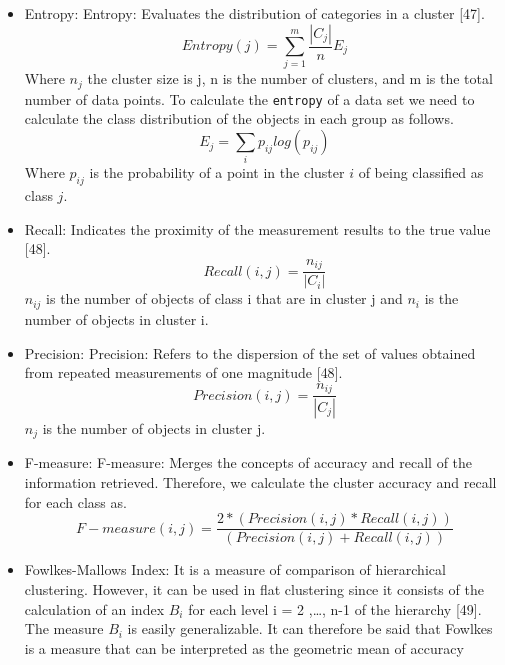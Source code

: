 \documentclass[
]{article}
\begin{document}
\begin{itemize}
\item
  Entropy: Entropy: Evaluates the distribution of categories in a
  cluster {[}47{]}. \begin{equation}
        Entropy(j) =  \sum_{j=1}^{m} \frac{|C_{j}|}{n}E_{j}
    \end{equation} Where \(n_{j}\) the cluster size is j, n is the
  number of clusters, and m is the total number of data points. To
  calculate the \texttt{entropy} of a data set we need to calculate the
  class distribution of the objects in each group as follows.
  \begin{equation}
        E_{j} =  \sum_{i} p_{ij}log(p_{ij})
    \end{equation} Where \(p_{ij}\) is the probability of a point in the
  cluster \(i\) of being classified as class \(j\).
\item
  Recall: Indicates the proximity of the measurement results to the true
  value {[}48{]}. \begin{equation}
         Recall(i,j) = \frac{n_{ij}}{|C_{i}|}
    \end{equation} \(n_{ij}\) is the number of objects of class i that
  are in cluster j and \(n_{i}\) is the number of objects in cluster i.
\item
  Precision: Precision: Refers to the dispersion of the set of values
  obtained from repeated measurements of one magnitude {[}48{]}.
  \begin{equation}
            Precision(i,j) = \frac{n_{ij}}{|C_{j}|}
        \end{equation} \(n_{j}\) is the number of objects in cluster j.
\item
  F-measure: F-measure: Merges the concepts of accuracy and recall of
  the information retrieved. Therefore, we calculate the cluster
  accuracy and recall for each class as. \begin{equation}
        F-measure(i,j) = \frac{2 * (Precision(i,j) * Recall(i,j))}{(Precision(i,j) + Recall(i,j))}
    \end{equation}
\item
  Fowlkes-Mallows Index: It is a measure of comparison of hierarchical
  clustering. However, it can be used in flat clustering since it
  consists of the calculation of an index \(B_{i}\) for each level i = 2
  ,\ldots, n-1 of the hierarchy {[}49{]}. The measure \(B_{i}\) is
  easily generalizable. It can therefore be said that Fowlkes is a
  measure that can be interpreted as the geometric mean of accuracy

\end{itemize}
\end{document}
